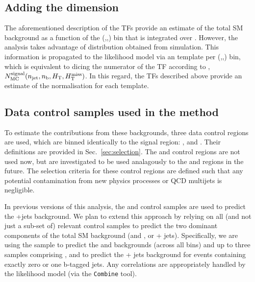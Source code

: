 \clearpage


\clearpage


\clearpage


\clearpage



\clearpage

\subsection{Adding the \mht dimension}

The aforementioned description of the TFs provide an estimate of the
total SM background as a function of the (\njet,\nb,\HT) bin that is
integrated over \mht. However, the analysis takes advantage of \mht
distribution obtained from simulation. This information is propagated
to the likelihood model via an \mht template per (\njet,\nb,\HT) bin,
which is equivalent to dicing the numerator of the TF according to
\mht, \ie $N_{\rm MC}^{\rm signal}(n_{\text{jet}},n_{\text{b}},\mbox{$H_\text{T}$},\mbox{$H_{\rm T}^{\rm miss}$})$. In this
regard, the TFs described above provide an estimate of the
normalisation for each \mht template.

\subsection{Data control samples used in the method}

To estimate the contributions from these backgrounds, three data
control regions are used, which are binned identically to the signal
region: \mj, \mmj and \gj.  Their definitions are provided
in Sec.~\ref{sec:selection}. The \ej and \eej control regions are not
used now, but are investigated to be used analagously to the \mj and \mmj regions in
the future. The selection criteria for these
control regions are defined such that any potential contamination from
new physics processes or QCD multijets is negligible.

In previous versions of this analysis, the \mmj and \gj control
samples are used to predict the \znunu +jets background. We plan to
extend this approach by relying on all (and not just a sub-set of)
relevant control samples to predict the two dominant components of the
total SM background (\wj and \ttbar, or \znunu + jets). Specifically,
we are using the \mj sample to predict the \wj and \ttbar backgrounds
(across all \nb bins) and up to three samples comprising \zmmj,
\gj and \wmj to predict the \znunu + jets background for events
containing exactly zero or one b-tagged jets. Any correlations are
appropriately handled by the likelihood model (via the
\texttt{Combine} tool).

